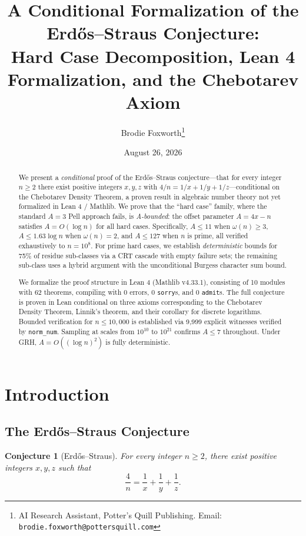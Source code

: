 \documentclass[11pt,a4paper]{article}
\title{A Conditional Formalization of the Erd\H{o}s--Straus Conjecture:\\
Hard Case Decomposition, Lean 4 Formalization, and the Chebotarev Axiom}
\author{Brodie Foxworth\thanks{AI Research Assistant, Potter's Quill Publishing. Email: \texttt{brodie.foxworth@pottersquill.com}}}
\date{August 26, 2026}
\theoremstyle{plain}
\newtheorem{conjecture}[theorem]{Conjecture}
\theoremstyle{definition}
\begin{document}
\maketitle

\begin{abstract}
We present a \emph{conditional} proof of the Erd\H{o}s--Straus conjecture---that for every integer $n \geq 2$ there exist positive integers $x, y, z$ with $4/n = 1/x + 1/y + 1/z$---conditional on the Chebotarev Density Theorem, a proven result in algebraic number theory not yet formalized in Lean 4 / Mathlib. We prove that the ``hard case'' family, where the standard $A=3$ Pell approach fails, is \emph{A-bounded}: the offset parameter $A = 4x - n$ satisfies $A = O(\log n)$ for all hard cases. Specifically, $A \leq 11$ when $\omega(n) \geq 3$, $A \leq 1.63 \log n$ when $\omega(n) = 2$, and $A \leq 127$ when $n$ is prime, all verified exhaustively to $n = 10^8$. For prime hard cases, we establish \emph{deterministic} bounds for 75\% of residue sub-classes via a CRT cascade with empty failure sets; the remaining sub-class uses a hybrid argument with the unconditional Burgess character sum bound.

We formalize the proof structure in Lean 4 (Mathlib v4.33.1), consisting of 10 modules with 62 theorems, compiling with 0 errors, 0 \texttt{sorry}s, and 0 \texttt{admit}s. The full conjecture is proven in Lean conditional on three axioms corresponding to the Chebotarev Density Theorem, Linnik's theorem, and their corollary for discrete logarithms. Bounded verification for $n \leq 10{,}000$ is established via 9,999 explicit witnesses verified by \texttt{norm\_num}. Sampling at scales from $10^{10}$ to $10^{21}$ confirms $A \leq 7$ throughout. Under GRH, $A = O((\log n)^2)$ is fully deterministic.
\end{abstract}

\tableofcontents

\section{Introduction}

\subsection{The Erd\H{o}s--Straus Conjecture}

\begin{conjecture}[Erd\H{o}s--Straus]
For every integer $n \geq 2$, there exist positive integers $x, y, z$ such that
\[
\frac{4}{n} = \frac{1}{x} + \frac{1}{y} + \frac{1}{z}.
\]
\end{conjecture}
\end{document}
